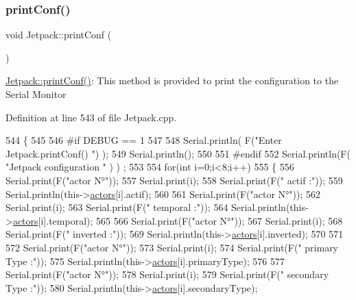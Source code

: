 \subsubsection{\texorpdfstring{print\+Conf()}{printConf()}}
{\footnotesize\ttfamily void Jetpack\+::print\+Conf (\begin{DoxyParamCaption}{ }\end{DoxyParamCaption})}

\hyperlink{class_jetpack_ac54a7bb4f9166bee32052253d9b1d306}{Jetpack\+::print\+Conf()}\+: This method is provided to print the configuration to the Serial Monitor 

Definition at line 543 of file Jetpack.\+cpp.


\begin{DoxyCode}
544 \{
545 
546 \textcolor{preprocessor}{#if DEBUG == 1 }
547 
548     Serial.println( F(\textcolor{stringliteral}{"Enter Jetpack.printConf() "}) );
549     Serial.println();
550 
551 \textcolor{preprocessor}{#endif }
552     Serial.println(F( \textcolor{stringliteral}{"Jetpack configuration "} ) ) ;
553  
554         \textcolor{keywordflow}{for}(\textcolor{keywordtype}{int} i=0;i<8;i++)
555     \{   
556         Serial.print(F(\textcolor{stringliteral}{"actor N°"}));
557         Serial.print(i);
558         Serial.print(F(\textcolor{stringliteral}{" actif :"}));
559         Serial.println(this->\hyperlink{class_jetpack_a7e16d2f97837f9712a2e6de1c50d99db}{actors}[i].actif);
560         
561         Serial.print(F(\textcolor{stringliteral}{"actor N°"}));
562         Serial.print(i);
563         Serial.print(F(\textcolor{stringliteral}{" temporal :"}));
564         Serial.println(this->\hyperlink{class_jetpack_a7e16d2f97837f9712a2e6de1c50d99db}{actors}[i].temporal);
565 
566         Serial.print(F(\textcolor{stringliteral}{"actor N°"}));
567         Serial.print(i);
568         Serial.print(F(\textcolor{stringliteral}{" inverted :"}));
569         Serial.println(this->\hyperlink{class_jetpack_a7e16d2f97837f9712a2e6de1c50d99db}{actors}[i].inverted);
570 
571 
572         Serial.print(F(\textcolor{stringliteral}{"actor N°"}));
573         Serial.print(i);
574         Serial.print(F(\textcolor{stringliteral}{" primary Type :"}));
575         Serial.println(this->\hyperlink{class_jetpack_a7e16d2f97837f9712a2e6de1c50d99db}{actors}[i].primaryType);
576 
577         Serial.print(F(\textcolor{stringliteral}{"actor N°"}));
578         Serial.print(i);
579         Serial.print(F(\textcolor{stringliteral}{" secondary Type :"}));       
580         Serial.println(this->\hyperlink{class_jetpack_a7e16d2f97837f9712a2e6de1c50d99db}{actors}[i].secondaryType);

\end{DoxyCode}
